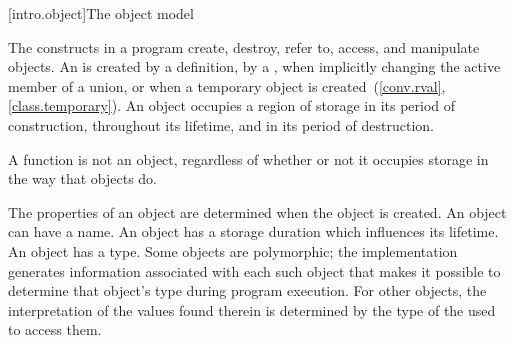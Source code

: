 [intro.object]{The \Cpp object model}

\pnum
{}%
The constructs in a \Cpp program create, destroy, refer to, access, and
manipulate objects.
An  is created
by a definition,
by a ,
when implicitly changing the active member of a union,
or
when a temporary object is created~(\ref{conv.rval}, \ref{class.temporary}).
An object occupies a region of storage
in its period of construction,
throughout its lifetime,
and
in its period of destruction.
\begin{note} A function is not an object, regardless of whether or not it
occupies storage in the way that objects do. \end{note}
The properties of an
object are determined when the object is created. An object can have a
name. An object has a storage
duration which influences its
lifetime. An object has a
type.
Some objects are
polymorphic; the implementation
generates information associated with each such object that makes it
possible to determine that object's type during program execution. For
other objects, the interpretation of the values found therein is
determined by the type of the 
used to access them.

